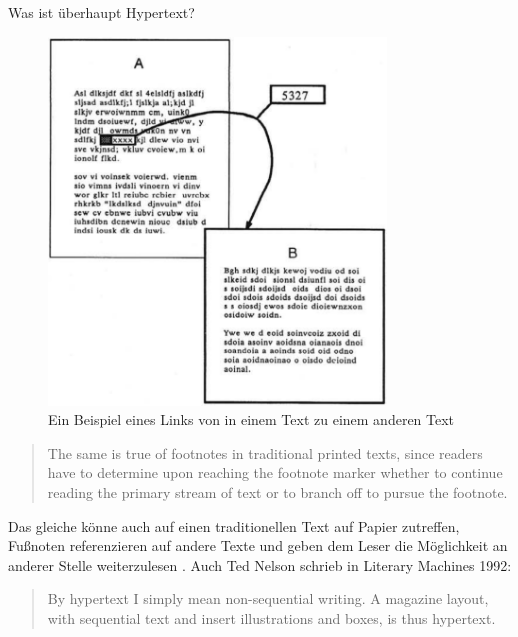 \begin{section}{Was ist überhaupt Hypertext?}
\begin{figure}[H]
	\centering
	\includegraphics[width=0.8\textwidth]{image/imText}
	\caption{Ein Beispiel eines Links von in einem Text zu einem anderen Text \cite[S.34]{Conklin1987}}
	\label{fig:imText}
\end{figure}

\begin{quote}
    \glqq The same is true of footnotes in traditional printed texts, since readers have to determine upon reaching the footnote marker whether to continue reading the primary stream of text or to branch off to pursue the footnote. \grqq{ }\cite{Nielsen1995}
\end{quote}

Das gleiche könne auch auf einen traditionellen Text auf Papier zutreffen, Fußnoten referenzieren auf andere Texte und geben dem Leser die Möglichkeit an anderer Stelle weiterzulesen \cite{Nielsen1995}. Auch Ted Nelson schrieb in Literary Machines 1992:

\begin{quote}
\glqq By hypertext I simply mean non-sequential writing. A magazine layout, with sequential text and insert illustrations and boxes, is thus hypertext.\grqq{ }\cite{Nelson1992}
\end{quote} 

\end{section}


